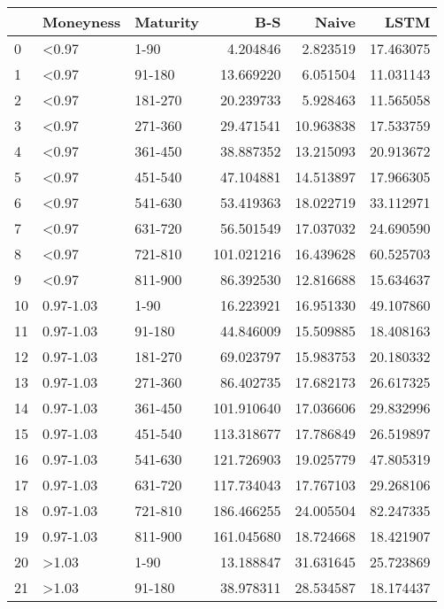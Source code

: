 \begin{tabular}{lllrrr}
\toprule
{} &  Moneyness & Maturity &         B-S &      Naive &       LSTM \\
\midrule
0  &      <0.97 &     1-90 &    4.204846 &   2.823519 &  17.463075 \\
1  &      <0.97 &   91-180 &   13.669220 &   6.051504 &  11.031143 \\
2  &      <0.97 &  181-270 &   20.239733 &   5.928463 &  11.565058 \\
3  &      <0.97 &  271-360 &   29.471541 &  10.963838 &  17.533759 \\
4  &      <0.97 &  361-450 &   38.887352 &  13.215093 &  20.913672 \\
5  &      <0.97 &  451-540 &   47.104881 &  14.513897 &  17.966305 \\
6  &      <0.97 &  541-630 &   53.419363 &  18.022719 &  33.112971 \\
7  &      <0.97 &  631-720 &   56.501549 &  17.037032 &  24.690590 \\
8  &      <0.97 &  721-810 &  101.021216 &  16.439628 &  60.525703 \\
9  &      <0.97 &  811-900 &   86.392530 &  12.816688 &  15.634637 \\
10 &  0.97-1.03 &     1-90 &   16.223921 &  16.951330 &  49.107860 \\
11 &  0.97-1.03 &   91-180 &   44.846009 &  15.509885 &  18.408163 \\
12 &  0.97-1.03 &  181-270 &   69.023797 &  15.983753 &  20.180332 \\
13 &  0.97-1.03 &  271-360 &   86.402735 &  17.682173 &  26.617325 \\
14 &  0.97-1.03 &  361-450 &  101.910640 &  17.036606 &  29.832996 \\
15 &  0.97-1.03 &  451-540 &  113.318677 &  17.786849 &  26.519897 \\
16 &  0.97-1.03 &  541-630 &  121.726903 &  19.025779 &  47.805319 \\
17 &  0.97-1.03 &  631-720 &  117.734043 &  17.767103 &  29.268106 \\
18 &  0.97-1.03 &  721-810 &  186.466255 &  24.005504 &  82.247335 \\
19 &  0.97-1.03 &  811-900 &  161.045680 &  18.724668 &  18.421907 \\
20 &      >1.03 &     1-90 &   13.188847 &  31.631645 &  25.723869 \\
21 &      >1.03 &   91-180 &   38.978311 &  28.534587 &  18.174437 \\

\end{tabular}
